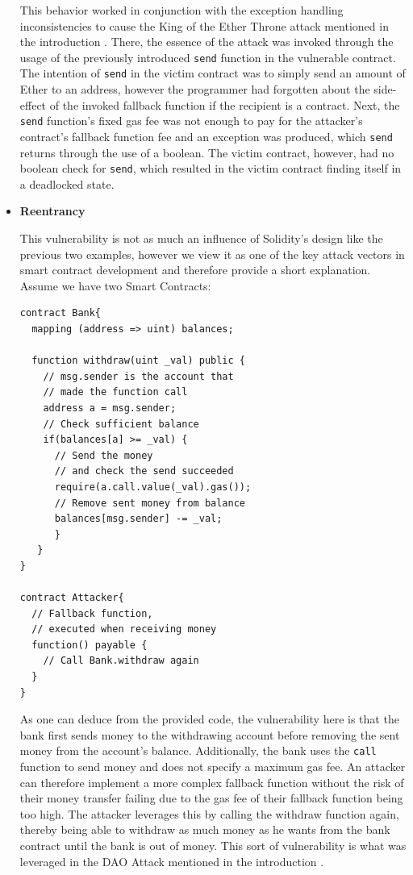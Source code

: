 \documentclass[letterpaper,twocolumn,10pt]{article}
\begin{document}
\begin{itemize}
  This behavior worked in conjunction with the exception handling inconsistencies to cause the King of the Ether Throne attack mentioned in the introduction \cite{atzei_bartoletti_cimoli_2017}. There, the essence of the attack was invoked through the usage of the previously introduced \verb|send| function in the vulnerable contract. The intention of \verb|send| in the victim contract was to simply send an amount of Ether to an address, however the programmer had forgotten about the side-effect of the invoked fallback function if the recipient is a contract. Next, the \verb|send| function's fixed gas fee was not enough to pay for the attacker's contract's fallback function fee and an exception was produced, which \verb|send| returns through the use of a boolean. The victim contract, however, had no boolean check for \verb|send|, which resulted in the victim contract finding itself in a deadlocked state.

    \item \textbf{Reentrancy}


    This vulnerability is not as much an influence of Solidity's design like the previous two examples, however we view it as one of the key attack vectors in smart contract development and therefore provide a short explanation. Assume we have two Smart Contracts:

  \begin{verbatim}
contract Bank{
  mapping (address => uint) balances;

  function withdraw(uint _val) public {
    // msg.sender is the account that
    // made the function call
    address a = msg.sender;
    // Check sufficient balance
    if(balances[a] >= _val) {
      // Send the money
      // and check the send succeeded
      require(a.call.value(_val).gas());
      // Remove sent money from balance
      balances[msg.sender] -= _val;
      }
   }
}

contract Attacker{
  // Fallback function,
  // executed when receiving money
  function() payable {
    // Call Bank.withdraw again
  }
}
  \end{verbatim}

As one can deduce from the provided code, the vulnerability here is that the bank first sends money to the withdrawing account before removing the sent money from the account's balance. Additionally, the bank uses the \verb|call| function to send money and does not specify a maximum gas fee. An attacker can therefore implement a more complex fallback function without the risk of their money transfer failing due to the gas fee of their fallback function being too high. The attacker leverages this by calling the withdraw function again, thereby being able to withdraw as much money as he wants from the bank contract until the bank is out of money. This sort of vulnerability is what was leveraged in the DAO Attack mentioned in the introduction \cite{atzei_bartoletti_cimoli_2017}.


\end{itemize}
\end{document}
